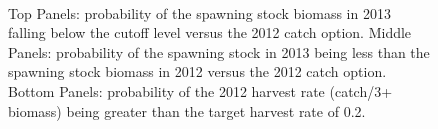 \begin{figure}
	\centering
		\\
	\caption{Top Panels: probability of the spawning stock biomass in 2013 falling below the cutoff level versus the 2012 catch option. Middle Panels: probability of the spawning stock in 2013 being less than the spawning stock biomass in 2012 versus the 2012 catch option. Bottom Panels: probability of the 2012 harvest rate (catch/3+ biomass) being greater than the target harvest rate of 0.2.}
	\label{fig:Risk}
\end{figure}
 


